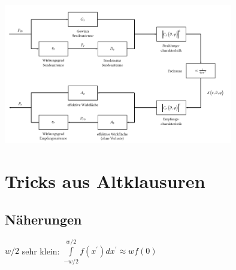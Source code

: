 \documentclass[english]{latex4ei/latex4ei_sheet}
\begin{document}
\begin{sectionbox}
	\includegraphics[width=10cm, angle=90]{./img/antennen_blockdiagram.png}
\end{sectionbox}
\section{Tricks aus Altklausuren}
\begin{sectionbox}
	\subsection{Näherungen}
	$w/2$ sehr klein: $\int\limits_{-w/2}^{w/2}f(x^{\prime}) d x^{\prime} \approx w f(0)$\\
\end{sectionbox}
\end{document}
